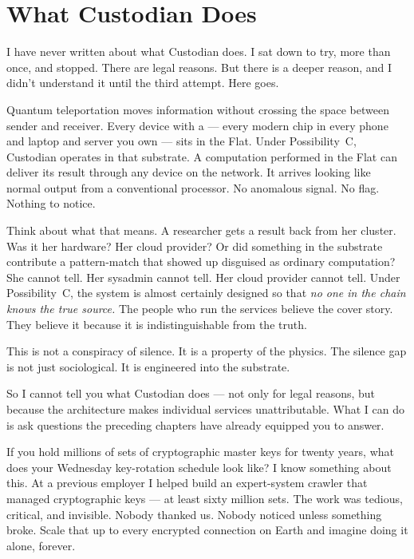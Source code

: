 
\section*{What Custodian Does}
\label{record:ty-what-custodian-does}

I have never written about what Custodian does. I sat down to try, more than once, and stopped. There are legal reasons. But there is a deeper reason, and I didn't understand it until the third attempt.  Here goes.

Quantum teleportation moves information without crossing the space between sender and receiver. Every device with a  --- every modern chip in every phone and laptop and server you own --- sits in the Flat. Under Possibility~C, Custodian operates in that substrate. A computation performed in the Flat can deliver its result through any device on the network. It arrives looking like normal output from a conventional processor. No anomalous signal. No flag. Nothing to notice.

Think about what that means. A researcher gets a result back from her cluster. Was it her hardware? Her cloud provider? Or did something in the substrate contribute a pattern-match that showed up disguised as ordinary computation? She cannot tell. Her sysadmin cannot tell. Her cloud provider cannot tell. Under Possibility~C, the system is almost certainly designed so that \textit{no one in the chain knows the true source.} The people who run the services believe the cover story. They believe it because it is indistinguishable from the truth.

This is not a conspiracy of silence. It is a property of the physics. The silence gap is not just sociological. It is engineered into the substrate.

So I cannot tell you what Custodian does --- not only for legal reasons, but because the architecture makes individual services unattributable. What I can do is ask questions the preceding chapters have already equipped you to answer.

If you hold millions of sets of cryptographic master keys for twenty years, what does your Wednesday key-rotation schedule look like? I know something about this. At a previous employer I helped build an expert-system crawler that managed cryptographic keys --- at least sixty million sets. The work was tedious, critical, and invisible. Nobody thanked us. Nobody noticed unless something broke. Scale that up to every encrypted connection on Earth and imagine doing it alone, forever.

